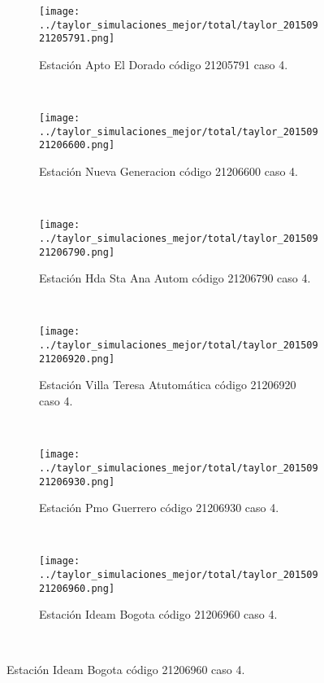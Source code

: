 \begin{figure}[H]\ContinuedFloat
\centering
\begin{subfigure}[normla]{0.4\textwidth}
\texttt{[image: ../taylor\_simulaciones\_mejor/total/taylor\_20150921205791.png]}
\caption{Estación Apto El Dorado código 21205791 caso 4.}
\end{subfigure}
~
\begin{subfigure}[normla]{0.4\textwidth}
\texttt{[image: ../taylor\_simulaciones\_mejor/total/taylor\_20150921206600.png]}
\caption{Estación Nueva Generacion código 21206600 caso 4.}
\end{subfigure}
~
\begin{subfigure}[normla]{0.4\textwidth}
\texttt{[image: ../taylor\_simulaciones\_mejor/total/taylor\_20150921206790.png]}
\caption{Estación Hda Sta Ana Autom código 21206790 caso 4.}
\end{subfigure}
~
\begin{subfigure}[normla]{0.4\textwidth}
\texttt{[image: ../taylor\_simulaciones\_mejor/total/taylor\_20150921206920.png]}
\caption{Estación Villa Teresa Atutomática código 21206920 caso 4.}
\end{subfigure}
~
\begin{subfigure}[normla]{0.4\textwidth}
\texttt{[image: ../taylor\_simulaciones\_mejor/total/taylor\_20150921206930.png]}
\caption{Estación Pmo Guerrero código 21206930 caso 4.}
\end{subfigure}
~
\begin{subfigure}[normla]{0.4\textwidth}
\texttt{[image: ../taylor\_simulaciones\_mejor/total/taylor\_20150921206960.png]}
\caption{Estación Ideam Bogota código 21206960 caso 4.}
\end{subfigure}
~
\end{figure}
 
